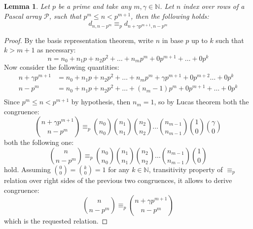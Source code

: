 \documentclass[11pt,a4paper]{article} %
\newtheorem{lemma}[theorem]{Lemma}
\begin{document}
    \begin{lemma}
        Let $p$ be a prime and take any $m, \gamma \in \mathbb{N}$. Let $n$ index
        over rows of a Pascal array $\mathcal{P}$, such that $p^{m} \leq n < p^{m+1}$, then the following holds:
        \begin{displaymath}
            d_{n,n-p^{m}} \equiv_{p} d_{n+\gamma p^{m+1}, n-p^{m}}
        \end{displaymath}
    \end{lemma}
    \begin{proof} %
        By the basis representation theorem, write $n$  in base $p$ up to $k$ such that $k > m+1$ as necessary:
        \begin{displaymath}
            n = n_{0} + n_{1}p + n_{2}p^2 + \ldots + n_{m}p^m + 0p^{m+1} + \ldots + 0p^k
        \end{displaymath}
        Now consider the following quantities:
        \begin{displaymath}
            \begin{split}
                n +\gamma p^{m+1} &= n_{0} + n_{1}p + n_{2}p^2 + \ldots + n_{m}p^m + \gamma p^{m+1} + 0p^{m+2} \ldots + 0p^k \\
                n - p^{m} &= n_{0} + n_{1}p + n_{2}p^2 + \ldots + (n_{m}-1)p^m + 0p^{m+1} + \ldots + 0p^k \\
            \end{split}
        \end{displaymath}
        Since $p^{m} \leq n < p^{m+1}$ by hypothesis, then $n_{m}=1$, so
        by Lucas theorem both the congruence:
        \begin{displaymath}
            {{n+\gamma p^{m+1}} \choose { n - p^{m}}} \equiv_{p} 
                {{n_{0}} \choose {n_{0}}}  
                {{n_{1}} \choose {n_{1}}} 
                {{n_{2}} \choose {n_{2}}}
                \ldots
                {{n_{m-1}} \choose {n_{m-1}} }
                {{1} \choose {0} }
                {{\gamma} \choose {0}} 
        \end{displaymath}
        both the following one:
        \begin{displaymath}
            {{n} \choose { n - p^{m}}} \equiv_{p} 
                {{n_{0}} \choose {n_{0}}}  
                {{n_{1}} \choose {n_{1}}} 
                {{n_{2}} \choose {n_{2}}}
                \ldots
                {{n_{m-1}} \choose {n_{m-1}}} 
                {{1} \choose {0} }
        \end{displaymath}
        hold. Assuming ${{0}\choose{0}} = {{k}\choose{0}} = 1$ for any $k\in\mathbb{N}$, 
        transitivity property of $\equiv_p$ relation over right sides of
        the previous two congruences, it allows to derive congruence:
        \begin{displaymath}
            {{n} \choose { n - p^{m}}} \equiv_{p} {{n+\gamma p^{m+1}} \choose { n - p^{m}}} 
        \end{displaymath}
        which is the requested relation.
    \end{proof}
\end{document}
